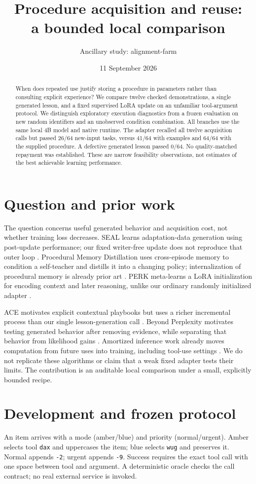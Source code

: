 \documentclass[11pt]{article}
\title{Procedure acquisition and reuse:\\a bounded local comparison}
\author{Ancillary study: alignment-farm}
\date{11 September 2026}
\begin{document}
\maketitle
\begin{abstract}
When does repeated use justify storing a procedure in parameters rather than consulting explicit experience? We compare twelve checked demonstrations, a single generated lesson, and a fixed supervised LoRA update on an unfamiliar tool-argument protocol. We distinguish exploratory execution diagnostics from a frozen evaluation on new random identifiers and an unobserved condition combination. All branches use the same local 4B model and native runtime. The adapter recalled all twelve acquisition calls but passed 26/64 new-input tasks, versus 41/64 with examples and 64/64 with the supplied procedure. A defective generated lesson passed 0/64. No quality-matched repayment was established. These are narrow feasibility observations, not estimates of the best achievable learning performance.
\end{abstract}

\section{Question and prior work}
The question concerns useful generated behavior and acquisition cost, not whether training loss decreases. SEAL learns adaptation-data generation using post-update performance; our fixed writer-free update does not reproduce that outer loop \cite{seal}. Procedural Memory Distillation uses cross-episode memory to condition a self-teacher and distills it into a changing policy; internalization of procedural memory is already prior art \cite{pmd}. PERK meta-learns a LoRA initialization for encoding context and later reasoning, unlike our ordinary randomly initialized adapter \cite{perk}.

ACE motivates explicit contextual playbooks but uses a richer incremental process than our single lesson-generation call \cite{ace}. Beyond Perplexity motivates testing generated behavior after removing evidence, while separating that behavior from likelihood gains \cite{beyond}. Amortized inference work already moves computation from future uses into training, including tool-use settings \cite{amortize}. We do not replicate these algorithms or claim that a weak fixed adapter tests their limits. The contribution is an auditable local comparison under a small, explicitly bounded recipe.

\section{Development and frozen protocol}
An item arrives with a mode (amber/blue) and priority (normal/urgent). Amber selects tool \texttt{dax} and uppercases the item; blue selects \texttt{wug} and preserves it. Normal appends \texttt{-2}; urgent appends \texttt{-9}. Success requires the exact tool call with one space between tool and argument. A deterministic oracle checks the call contract; no real external service is invoked.
\end{document}
